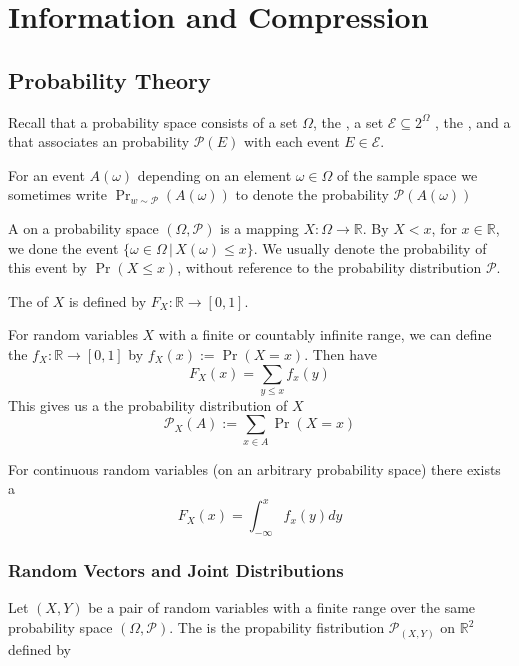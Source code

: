 \chapter{Information and Compression}
\section{Probability Theory}
Recall that a probability space consists of a set $\Omega$\mathmarginbox{$\Omega$}, the , a set $\mathcal{E} \subseteq 2^{\Omega}$ , the , and a  that associates an probability $\mathcal{P}(E)$ with each event $E \in \mathcal{E}$.

For an event $A(\omega)$ depending on an element $\omega \in \Omega$ of the sample space we sometimes write $\operatorname{Pr}_{w\sim\mathcal{P}}(A(\omega))$ to denote the probability $\mathcal{P}(A(\omega))$

A  on a probability space $(\Omega,\mathcal{P})$ is a mapping $X: \Omega \rightarrow \mathbb{R}$. By $X < x$, for  $x \in \mathbb{R}$, we done the event $\{\omega \in \Omega \,|\, X(\omega) \leq x\}$. We usually denote the probability of this event by $\operatorname{Pr}(X \leq x)$, without reference to the probability distribution $\mathcal{P}$.

The  of $X$ is defined by $F_X:\mathbb{R} \rightarrow [0,1]$.

For random variables $X$ with a finite or countably infinite range, we can define the  $f_X:\mathbb{R} \rightarrow [0,1]$ by $f_X(x) := \operatorname{Pr}(X=x)$. Then have
\begin{equation*}
F_X(x)=\sum_{y\leq x}f_x(y)
\end{equation*}
This gives us a  the probability distribution of $X$
\begin{equation*}
\mathcal{P}_X(A) := \sum_{x \in A} \operatorname{Pr}(X = x)
\end{equation*}

For continuous random variables (on an arbitrary probability space) there exists a 
\begin{equation*}
F_X(x) = \int_{-\infty}^{x}f_x(y)dy
\end{equation*}

\subsection{Random Vectors and Joint Distributions}
Let $(X,Y)$ be a pair of random variables with a finite range over the same probability space $(\Omega,\mathcal{P})$. The  is the propability fistribution $\mathcal{P}_{(X,Y)}$ on $\mathbb{R}^2$ defined by

